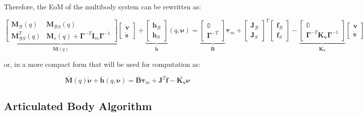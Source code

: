 Therefore, the \ac{EoM} of the multibody system can be rewritten as:

$$
\underbrace{\begin{bmatrix}
\mathbf{M} _{\mathcal{B}}(q) & \mathbf{M} _{\mathcal{B}S}(q) \\
\mathbf{M} _{\mathcal{B}S} ^T(q) & \mathbf{M} _s(q) + \boldsymbol{\Gamma} ^{-T}\mathbf{I} _m\boldsymbol{\Gamma} ^{-1}
\end{bmatrix}} _{\mathbf{\bar{M}}(q)}
\begin{bmatrix}
\dot{\mathrm{\mathbf{v}}} \\
\ddot{\mathbf{s}}
\end{bmatrix}+
\underbrace{\begin{bmatrix}
\mathbf{h} _{\mathcal{B}} \\
\mathbf{h} _S
\end{bmatrix}} _\mathbf{\bar{h}}(q,\boldsymbol{\nu}) =
\underbrace{\begin{bmatrix}
\mathbb{0} \\
\boldsymbol{\Gamma} ^{-T}
\end{bmatrix}} _{\mathbf{\bar{B}}}
\boldsymbol{\tau} _m
+
\begin{bmatrix}
\mathbf{J} _{\mathcal{B}} \\
\mathbf{J} _S
\end{bmatrix} ^T
\begin{bmatrix}
\mathbf{f} _{\mathcal{B}} \\
\mathbf{f} _S
\end{bmatrix}-
\underbrace{\begin{bmatrix}
\mathbb{0} \\
\boldsymbol{\Gamma} ^{-T}\mathbf{K _v}\boldsymbol{\Gamma} ^{-1}
\end{bmatrix}} _\mathbf{\bar{K _v}}
\begin{bmatrix}
\mathrm{\mathbf{v}} \\
\dot{\mathbf{s}}
\end{bmatrix}
$$

or, in a more compact form that will be used for computation as:

$$
\mathbf{\bar{M}}(q)\dot{\boldsymbol{\nu}} + \mathbf{\bar{h}}(q,\boldsymbol{\nu}) = \mathbf{\bar{B}}\boldsymbol{\tau} _m + \mathbf{J} ^T \mathbf{f} - \bar{\mathbf{K _v}}\boldsymbol{\nu}
$$

\subsection{Articulated Body Algorithm}

